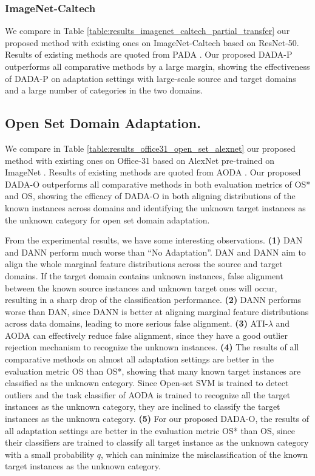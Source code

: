 \documentclass[letterpaper]{article} \usepackage{aaai20}  \usepackage{times}  \usepackage{helvet} \usepackage{courier}  \usepackage[hyphens]{url}  \usepackage{graphicx} \urlstyle{rm} \def\UrlFont{\rm}  \usepackage{graphicx}  \frenchspacing  \setlength{\pdfpagewidth}{8.5in}  \setlength{\pdfpageheight}{11in}
\begin{document}
\subsubsection{ImageNet-Caltech}
We compare in Table \ref{table:results_imagenet_caltech_partial_transfer} our proposed method with existing ones on ImageNet-Caltech based on ResNet-50. Results of existing methods are quoted from PADA \cite{pada}. Our proposed DADA-P outperforms all comparative methods by a large margin, showing the effectiveness of DADA-P on adaptation settings with large-scale source and target domains and a large number of categories in the two domains. 

\subsection{Open Set Domain Adaptation. }We compare in Table \ref{table:results_office31_open_set_alexnet} our proposed method with existing ones on Office-31 based on AlexNet \cite{alexnet} pre-trained on ImageNet \cite{imagenet}. Results of existing methods are quoted from AODA \cite{bp_for_os}. Our proposed DADA-O outperforms all comparative methods in both evaluation metrics of OS* and OS, showing the efficacy of DADA-O in both aligning distributions of the known instances across domains and identifying the unknown target instances as the unknown category for open set domain adaptation. 

From the experimental results, we have some interesting observations. \textbf{(1)} DAN and DANN perform much worse than ``No Adaptation''. DAN and DANN aim to align the whole marginal feature distributions across the source and target domains. If the target domain contains unknown instances, false alignment between the known source instances and unknown target ones will occur, resulting in a sharp drop of the classification performance. \textbf{(2)} DANN performs worse than DAN, since DANN is better at aligning marginal feature distributions across data domains, leading to more serious false alignment. \textbf{(3)} ATI-$\lambda$ and AODA can effectively reduce false alignment, since they have a good outlier rejection mechanism to recognize the unknown instances. \textbf{(4)} The results of all comparative methods on almost all adaptation settings are better in the evaluation metric OS than OS*, showing that many known target instances are classified as the unknown category. Since Open-set SVM is trained to detect outliers and the task classifier of AODA is trained to recognize all the target instances as the unknown category, they are inclined to classify the target instances as the unknown category. \textbf{(5)} For our proposed DADA-O, the results of all adaptation settings are better in the evaluation metric OS* than OS, since their classifiers are trained to classify all target instance as the unknown category with a small probability $q$, which can minimize the misclassification of the known target instances as the unknown category.
\end{document}
